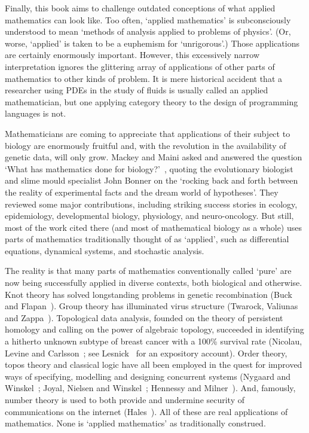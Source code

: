 Finally, this book aims to challenge outdated conceptions of what
applied%
%
% 
mathematics can look like.  Too often, `applied mathematics' is
subconsciously understood to mean `methods of analysis applied to problems
of physics'.  (Or, worse, `applied' is taken to be a euphemism for
`unrigorous'.)  Those applications are certainly enormously important.
However, this excessively narrow interpretation ignores the glittering
array of applications of other parts of mathematics to other kinds of
problem.  It is mere historical accident that a researcher using PDEs in
the study of fluids is usually called an applied mathematician, but one
applying category theory to the design of programming languages is not.

Mathematicians are coming to appreciate that applications of their subject
to biology are enormously fruitful and, with the revolution in the
availability of genetic data, will only grow.  Mackey and Maini asked and
answered the question `What has mathematics done for
biology?'~\cite{MaMa},%
% 
%
% 
quoting the evolutionary biologist and slime mould specialist
John%
%
% 
Bonner on the `rocking back and forth between the reality of experimental
facts and the dream world of hypotheses'.  They reviewed some major
contributions, including striking success stories in ecology, epidemiology,
developmental biology, physiology, and neuro-oncology.  But still, most of
the work cited there (and most of mathematical biology as a whole) uses
parts of mathematics traditionally thought of as `applied', such as
differential equations, dynamical systems, and stochastic analysis.

The reality is that many parts of mathematics conventionally called `pure'
are now being successfully applied in diverse contexts, both biological and
otherwise.  Knot theory has solved longstanding problems in genetic
recombination (Buck and Flapan~\cite{BuFlPKC,BuFlTCK}).  Group theory has
illuminated virus structure (Twarock, Valiunas and Zappa~\cite{TVZ}).
Topological data analysis, founded on the theory of persistent%
%
%
homology and
calling on the power of algebraic topology, succeeded in identifying a
hitherto unknown subtype of breast cancer with a 100\% survival rate
(Nicolau, Levine and Carlsson~\cite{NLC}; see Lesnick~\cite{Lesn} for an
expository account).  Order theory, topos theory and classical logic have
all been employed in the quest for improved ways of specifying, modelling
and designing concurrent systems (Nygaard and Winskel~\cite{NyWi}; Joyal,
Nielsen and Winskel~\cite{JNW}; Hennessy and Milner~\cite{HeMi}).  And,
famously, number theory is used to both provide and undermine security of
communications on the internet (Hales~\cite{HaleNBD}).  All of these are
real applications of mathematics.  None is `applied mathematics' as
traditionally construed.

